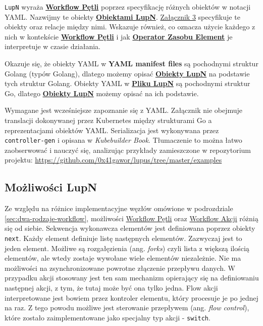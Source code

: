 \texttt{LupN} wyraża \hyperlink{def:workflow-petli}{\textbf{Workflow Pętli}} poprzez specyfikację różnych obiektów w notacji YAML. Nazwijmy te obiekty \hyperlink{def:obiekt-lupn}{\textbf{Obiektami LupN}}. \hyperref[appendix:3]{Załącznik 3} specyfikuje te obiekty oraz relacje między nimi. Wskazuje również, co oznacza użycie każdego z nich w kontekście \hyperlink{def:workflow-petli}{\textbf{Workflow Pętli}} i jak \hyperlink{def:operator-zasobu-element}{\textbf{Operator Zasobu Element}} je interpretuje w czasie działania.

Okazuje się, że obiekty YAML w \textbf{YAML manifest files} są pochodnymi struktur Golang (typów Golang), dlatego możemy opisać \hyperlink{def:obiekt-lupn}{\textbf{Obiekty LupN}} na podstawie tych struktur Golang. Obiekty YAML w \hyperlink{def:plik-lupn}{\textbf{Pliku LupN}} są pochodnymi struktur Go, dlatego \hyperlink{def:obiekt-lupn}{\textbf{Obiekty LupN}} możemy opisać na ich podstawie. 

Wymagane jest wcześniejsze zapoznanie się z YAML. Załącznik nie obejmuje translacji dokonywanej przez Kubernetes między strukturami Go a reprezentacjami obiektów YAML. Serializacja jest wykonywana przez \texttt{controller-gen} i opisana w \textit{Kubebuilder Book}. Tłumaczenie to można łatwo zaobserwować i nauczyć się, analizując przykłady zamieszczone w repozytorium projektu: \url{https://github.com/0x41gawor/lupus/tree/master/examples}

\subsection{Możliwości LupN}

Ze względu na różnice implementacyjne węzłów omówione w podrozdziale \ref{sec:dwa-rodzaje-workflow}, możliwości \hyperlink{def:workflow-petli}{Workflow Pętli} oraz \hyperlink{def:workflow-akcji}{Workflow Akcji} różnią się od siebie. Sekwencja wykonawcza elementów jest definiowana poprzez obiekty \texttt{next}. Każdy element definiuje listę następnych elementów. Zazwyczaj jest to jeden element. Możliwe są rozgałęzienia (ang. \textit{forks}) czyli lista z większą ilością elementów, ale wtedy zostaje wywołane wiele elementów niezależnie. Nie ma możliwości na zsynchronizowane powrotne złączenie przepływu danych. W przypadku akcji stosowany jest ten sam mechanizm opierający się na definiowaniu następnej akcji, z tym, że tutaj może być ona tylko jedna. Flow akcji interpretowane jest bowiem przez kontroler elementu, który procesuje je po jednej na raz. Z tego powodu możliwe jest sterowanie przepływem (ang. \textit{flow control}), które zostało zaimplementowane jako specjalny typ akcji - \texttt{switch}. 

